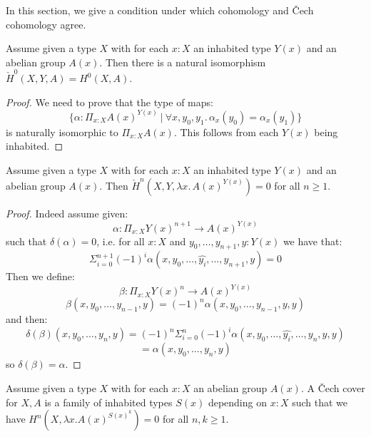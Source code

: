 \label{abelian-higher-cech}
In this section, we give a condition under which cohomology and \v Cech cohomology agree. 

\begin{lemma}\label{ZeroCohomologyAgree}
  Assume given a type $X$ with for each $x:X$ an inhabited type $Y(x)$ and an abelian group $A(x)$. Then there is a natural isomorphism $\check H^0(X,Y, A) = H^0(X, A)$. 
\end{lemma}

\begin{proof}
We need to prove that the type of maps:
\[\{\alpha:\Pi_{x:X}A(x)^{Y(x)}\ |\ \forall x,y_0,y_1.\, \alpha_x(y_0)=\alpha_x(y_1)\}\]
is naturally isomorphic to $\Pi_{x:X}A(x)$. This follows from each $Y(x)$ being inhabited.
\end{proof}

\begin{lemma}\label{cech-coefficient-lemma}
Assume given a type $X$ with for each $x:X$ an inhabited type $Y(x)$ and an abelian group $A(x)$. Then $\check{H}^n(X,Y,\lambda x.\, A(x)^{Y(x)})=0$ for all $n\geq 1$.
\end{lemma}

\begin{proof}
Indeed assume given:
\[\alpha : \Pi_{x:X} Y(x)^{n+1}\to A(x)^{Y(x)}\]
such that $\delta(\alpha) = 0$, i.e. for all $x:X$ and $y_0,\hdots, y_{n+1},y:Y(x)$ we have that:
\[\Sigma_{i=0}^{n+1}(-1)^i\alpha(x,y_0,\hdots,\widehat{y_i},\hdots ,y_{n+1},y) = 0\]
Then we define:
\[\beta : \Pi_{x:X} Y(x)^{n}\to A(x)^{Y(x)}\]
\[\beta(x,y_0,\hdots,y_{n-1},y) = (-1)^n\alpha(x,y_0,\hdots,y_{n-1},y,y)\]
and then:
\[\delta(\beta)(x,y_0,\hdots,y_{n},y) = (-1)^n\Sigma_{i=0}^{n} (-1)^i \alpha(x,y_0,\hdots,\hat{y_i},\hdots,y_n,y,y) \]
\[= \alpha(x,y_0,\hdots,y_n,y)\]
so $\delta(\beta) = \alpha$.
\end{proof}

\begin{definition}\label{cech-cover-abstract}
 Assume given a type $X$ with for each $x:X$ an abelian group $A(x)$. A \v Cech cover for $X,A$ is a family of inhabited types $S(x)$ depending on $x:X$ such that %
 we have $H^n(X,\lambda x. A(x)^{S(x)^k}) = 0$  for all $n,k\geq 1$.
 \end{definition}


